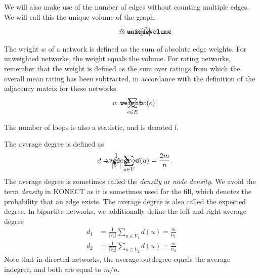 \documentclass{article}
\def\mathnote#1{%
  \tag*{\rlap{\hspace\marginparsep\smash{\parbox[t]{\marginparwidth}{#1}}}}
}
\begin{document}
We will also make use of the number of edges without counting multiple
edges.  We will call this the unique volume of the graph. 
\begin{align}
  \mathnote{\texttt{uniquevolume}}
  \bar{\bar m} &= m[\bar{\bar{G}}]
\end{align}

The weight $w$ of a network is defined as the sum of absolute edge weights.  For
unweighted networks, the weight equals the volume. For rating networks,
remember that the weight is defined as the sum over ratings from which the overall
mean rating has been subtracted, in accordance with the definition of
the adjacency matrix for these networks. 
\begin{align}
  \mathnote{\texttt{weight}}
  w &= \sum_{e \in E} |w(e)|
\end{align}

The number of loops is also a statistic, and is denoted
$l$.  

The average degree is defined as
\begin{align}
  \mathnote{\texttt{avgdegree}}
  d &= \frac 1 {|V|} \sum_{u\in V} d(u) = \frac {2m} n . 
\end{align}
The average degree is sometimes called the \emph{density} or \emph{node density}.  We avoid the term
\emph{density} in KONECT as it is sometimes used for the fill, which
denotes the probability that an edge exists.  The average degree is also
called the expected degree.  
In bipartite networks, we
additionally define the left and right average degree
\begin{align}
  d_1 &= \frac 1 {|V_1|} \sum_{u \in V_1} d(u) = \frac m {n_1} \\
  d_2 &= \frac 1 {|V_2|} \sum_{u \in V_2} d(u) = \frac m {n_2} 
\end{align}
Note that in directed networks, the average outdegree equals the average
indegree, and both are equal to $m/n$. 
\end{document}
